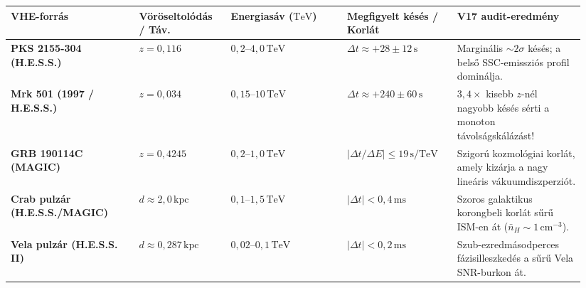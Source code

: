 \begin{center}\vspace{-2pt}
{\footnotesize
\begin{tabular}{@{}>{\bfseries}p{0.21\linewidth}p{0.15\linewidth}p{0.19\linewidth}p{0.18\linewidth}p{0.21\linewidth}@{}}
\toprule
VHE-forr\'as & V\"or\"oseltol\'od\'as / T\'av. & Energias\'av ($\text{TeV}$) & Megfigyelt k\'es\'es / Korl\'at & V17 audit-eredm\'eny \\
\midrule
PKS 2155-304 (H.E.S.S.) & $z = 0{,}116$ & $0{,}2\text{--}4{,}0\,\text{TeV}$ & $\Delta t \approx +28 \pm 12\,\text{s}$ & Margin\'alis $\sim 2\sigma$ k\'es\'es; a bels\H{o} SSC-emisszi\'os profil domin\'alja. \\
Mrk 501 (1997 / H.E.S.S.) & $z = 0{,}034$ & $0{,}15\text{--}10\,\text{TeV}$ & $\Delta t \approx +240 \pm 60\,\text{s}$ & $3{,}4\times$ kisebb $z$-n\'el nagyobb k\'es\'es s\'erti a monoton t\'avols\'agsk\'al\'az\'ast! \\
GRB 190114C (MAGIC) & $z = 0{,}4245$ & $0{,}2\text{--}1{,}0\,\text{TeV}$ & $|\Delta t / \Delta E| \le 19\,\text{s/TeV}$ & Szigor\'u kozmol\'ogiai korl\'at, amely kiz\'arja a nagy line\'aris v\'akuumdiszperzi\'ot. \\
Crab pulz\'ar (H.E.S.S./MAGIC) & $d \approx 2{,}0\,\text{kpc}$ & $0{,}1\text{--}1{,}5\,\text{TeV}$ & $|\Delta t| < 0{,}4\,\text{ms}$ & Szoros galaktikus korongbeli korl\'at s\H{u}r\H{u} ISM-en \'at ($\bar{n}_H \sim 1\,\text{cm}^{-3}$). \\
Vela pulz\'ar (H.E.S.S. II) & $d \approx 0{,}287\,\text{kpc}$ & $0{,}02\text{--}0{,}1\,\text{TeV}$ & $|\Delta t| < 0{,}2\,\text{ms}$ & Szub-ezredm\'asodperces f\'azisilleszked\'es a s\H{u}r\H{u} Vela SNR-burkon \'at. \\
\bottomrule
\end{tabular}}
\end{center}


